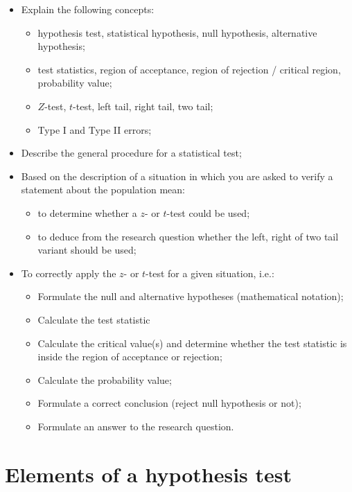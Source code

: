 \begin{itemize}
  \item Explain the following concepts:
  \begin{itemize}
    \item hypothesis test, statistical hypothesis, null hypothesis, alternative hypothesis;
    \item test statistics, region of acceptance, region of rejection / critical region, probability value;
    \item $Z$-test, $t$-test, left tail, right tail, two tail;
    \item Type I and Type II errors;
  \end{itemize}
  \item Describe the general procedure for a statistical test;
  \item Based on the description of a situation in which you are asked to verify a statement about the population mean:
  \begin{itemize}
    \item to determine whether a $z$- or $t$-test could be used;
    \item to deduce from the research question whether the left, right of two tail variant should be used;
  \end{itemize}
  \item To correctly apply the $z$- or $t$-test for a given situation, i.e.:
  \begin{itemize}
    \item Formulate the null and alternative hypotheses (mathematical notation);
    \item Calculate the test statistic
    \item Calculate the critical value(s) and determine whether the test statistic is inside the region of acceptance or rejection;
    \item Calculate the probability value;
    \item Formulate a correct conclusion (reject null hypothesis or not);
    \item Formulate an answer to the research question.
  \end{itemize}
\end{itemize}

\section{Elements of a hypothesis test}
\label{sec:elements-hypothesis-test}

